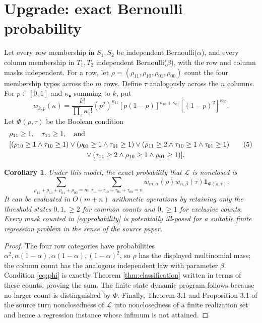 \documentclass[11pt]{article}
\newtheorem{corollary}{Corollary}
\begin{document}
\section{Upgrade: exact Bernoulli probability}

Let every row membership in $S_1,S_2$ be independent Bernoulli($\alpha$), and
every column membership in $T_1,T_2$ independent Bernoulli($\beta$), with the
row and column masks independent. For a row, let
$\rho=(\rho_{11},\rho_{10},\rho_{01},\rho_{00})$ count the four membership
types across the $m$ rows. Define $\tau$ analogously across the $n$ columns.
For $p\in[0,1]$ and $\kappa_\bullet$ summing to $k$, put
\[
 w_{k,p}(\kappa)=\frac{k!}{\prod_z\kappa_z!}
 (p^2)^{\kappa_{11}}[p(1-p)]^{\kappa_{10}+\kappa_{01}}
 [(1-p)^2]^{\kappa_{00}}.
\]
Let $\Phi(\rho,\tau)$ be the Boolean condition
\[
\begin{split}
 &\rho_{11}\ge1,\quad\tau_{11}\ge1,\quad\text{and}\\
 &[(\rho_{10}\ge1\wedge\tau_{10}\ge1)
 \vee(\rho_{01}\ge1\wedge\tau_{01}\ge1)
 \vee(\rho_{11}\ge2\wedge\tau_{10}\ge1\wedge\tau_{01}\ge1)\\
 &\hspace{38mm}\vee(\tau_{11}\ge2\wedge\rho_{10}\ge1\wedge\rho_{01}\ge1)].
\end{split}\tag{5}\label{eq:phi}
\]

\begin{corollary}\label{cor:probability}
Under this model, the exact probability that $\mathcal L$ is nonclosed is
\[
 \boxed{\displaystyle
 \sum_{\rho_{11}+\rho_{10}+\rho_{01}+\rho_{00}=m}
 \sum_{\tau_{11}+\tau_{10}+\tau_{01}+\tau_{00}=n}
 w_{m,\alpha}(\rho)w_{n,\beta}(\tau)\mathbf1_{\Phi(\rho,\tau)}.}
 \tag{6}\label{eq:probability}
\]
It can be evaluated in $O(m+n)$ arithmetic operations by retaining only the
threshold states $0,1,\ge2$ for common counts and $0,\ge1$ for exclusive counts.
Every mask counted in \eqref{eq:probability} is potentially ill-posed for a suitable
finite regression problem in the sense of the source paper.
\end{corollary}

\begin{proof}
The four row categories have probabilities
$\alpha^2,\alpha(1-\alpha),\alpha(1-\alpha),(1-\alpha)^2$, so $\rho$ has the
displayed multinomial mass; the column count has the analogous independent
law with parameter $\beta$. Condition \eqref{eq:phi} is exactly Theorem
\ref{thm:classification} written in terms of these counts, proving the sum.
The finite-state dynamic program follows because no larger count is
distinguished by $\Phi$. Finally, Theorem 3.1 and Proposition 3.1 of the source
turn nonclosedness of $\mathcal L$ into nonclosedness of a finite realization
set and hence a regression instance whose infimum is not attained.
\end{proof}
\end{document}
